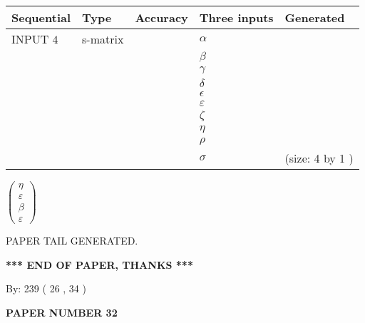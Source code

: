 \documentclass[12pt]{article}
\begin{document}
  
\noindent\begin{tabular}{|l|l|l|l|l|}
\hline
 Sequential & Type & Accuracy & Three inputs & Generated \\ 
\hline
 
 
  INPUT $            4 $ & s-matrix & & 
 $  \alpha $ & 
  \\
  & & & 
 $  \beta $ & 
  \\
  & & & 
 $  \gamma $ & 
  \\
  & & & 
 $  \delta $ & 
  \\
  & & & 
 $  \epsilon $ & 
  \\
  & & & 
 $  \varepsilon $ & 
  \\
  & & & 
 $                     \zeta $ & 
  \\
  & & & 
 $  \eta $ & 
  \\
  & & & 
 $  \rho $ & 
  \\
  & & & 
 $  \sigma $ & 
  (size:            4  by            1 )
 \\  \hline  
 \end{tabular}
   
   
 $  \left( \begin{array}
 {
 c
 }
 \eta \\ 
 \varepsilon \\ 
 \beta \\ 
 \varepsilon
 \end{array} \right) $ 
   
   
   
   
 \vspace{0.2in}
 
   
   
\vspace{2.0in} PAPER TAIL GENERATED.
   
   
   
   
\vspace{1.0in} 
{\textbf{\large{ *** END OF PAPER, THANKS *** }}} 
   
   
\hspace{1.0in} By: 
         239 (          26 ,           34 )
   
   
   
   
\newpage 
\setcounter{page}{ 
    32001 } 
   
   
   
   
 {\textbf{ \Large{ PAPER NUMBER           32  }}}
   
   
\vspace{0.2in}
   
\end{document}
